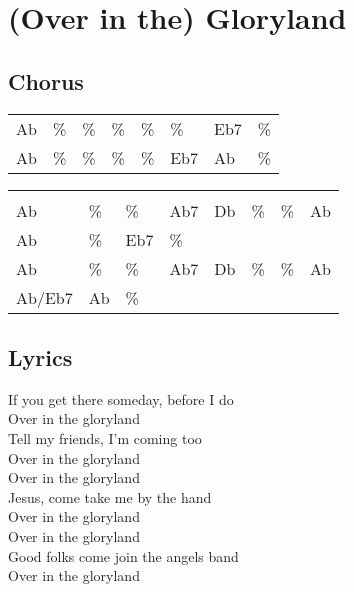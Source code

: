 \section{(Over in the) Gloryland}


\subsection*{Chorus}


\begin{tabular}{l l l l l l l l}
Ab & \% & \% & \% & \% & \% & Eb7 & \% \\ 
Ab & \% & \% & \% & \% & Eb7 & Ab & \% \\ 
\end{tabular}


\begin{tabular}{l l l l l l l l}
\\ \\ 
Ab & \% & \% & Ab7 & Db & \% & \% & Ab \\ 
Ab & \% & Eb7 & \% \\ 
Ab & \% & \% & Ab7 & Db & \% & \% & Ab \\ 
Ab/Eb7 & Ab & \% \\ 
\end{tabular}


\subsection*{Lyrics}


If you get there someday, before I do \\ 
Over in the gloryland \\ 
Tell my friends, I'm coming too \\ 
Over in the gloryland \\ 

Over in the gloryland \\ 
Jesus, come take me by the hand \\ 
Over in the gloryland \\ 
Over in the gloryland \\ 
Good folks come join the angels band \\ 
Over in the gloryland \\ 
